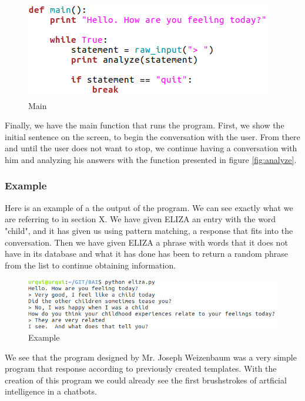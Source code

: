 \documentclass[12pt,twoside]{article}
\theoremstyle{plain}
\theoremstyle{definition}
\theoremstyle{remark}
\begin{document}
\begin{figure}[h]
\centering
\includegraphics[scale=0.6]{./Pictures/main.png}
\caption{Main}
\label{fig:main}

\end{figure}
Finally, we have the main function that runs the program. First, we show the initial sentence on the screen, to begin the conversation with the user. From there and until the user does not want to stop, we continue having a conversation with him and analyzing his answers with the function presented in figure \ref{fig:analyze}.\\


\subsubsection{Example}
	\label{sec:example}
	
Here is an example of a the output of the program. We can see exactly what we are referring to in section X. We have given ELIZA an entry with the word "child", and it has given us using pattern matching, a response that fits into the conversation. Then we have given ELIZA a phrase with words that it does not have in its database and what it has done has been to return a random phrase from the list to continue obtaining information.

\begin{figure}[h]
\centering
\includegraphics[scale=0.6]{./Pictures/example.png}
\caption{Example}
\end{figure}

We see that the program designed by Mr. Joseph Weizenbaum was a very simple program that response according to previously created templates. With the creation of this program we could already see the first brushstrokes of artficial intelligence in a chatbots.
 
\end{document}
